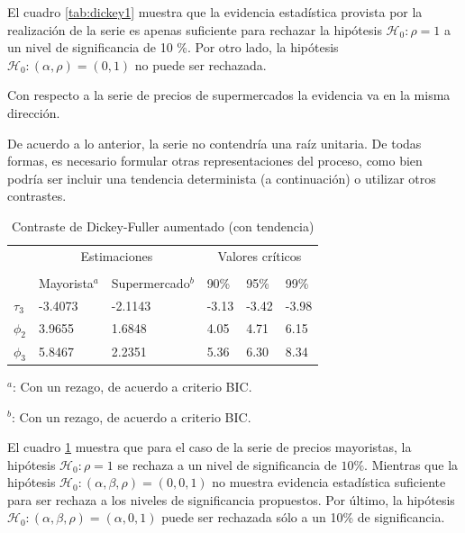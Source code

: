 \documentclass[12pt, twoside]{book}\usepackage[]{graphicx}\usepackage[]{color}
\numberwithin{equation}{section}
\numberwithin{theorem}{section}
\numberwithin{teorema}{section}
\numberwithin{defi}{section}
\numberwithin{prop}{section}
\numberwithin{defi}{section}
\theoremstyle{plain}
\begin{document}
El cuadro \ref{tab:dickey1} muestra que la evidencia estadística provista por la realización de la serie es apenas suficiente para rechazar la hipótesis $\mathcal{H}_{0}: \rho = 1$ a un nivel de significancia de 10 \%. Por otro lado, la hipótesis $\mathcal{H}_{0}: (\alpha,\rho) = (0,1) $ no puede ser rechazada.

Con respecto a la serie de precios de supermercados la evidencia va en la misma dirección. 

De acuerdo a lo anterior, la serie no contendría una raíz unitaria. De todas formas, es necesario formular otras representaciones del proceso, como bien podría ser incluir una tendencia determinista (a continuación) o utilizar otros contrastes. 

\begin{table}[!htpb]
\centering
\begin{threeparttable}
\caption{Contraste de Dickey-Fuller aumentado (con tendencia)\label{tab:dickey2}}
\begin{tabular}{@{}llllll@{}}
\toprule
\multicolumn{1}{l}{} & \multicolumn{2}{c}{Estimaciones} &
\multicolumn{3}{c}{Valores críticos} \\
\cmidrule(l){2-3} \cmidrule(l){4-6} \\
\multicolumn{1}{l}{} & \multicolumn{1}{c}{Mayorista$^{a}$} &
 \multicolumn{1}{c}{Supermercado$^{b}$} &
\multicolumn{1}{l}{90\%}&
\multicolumn{1}{l}{95\%}&
\multicolumn{1}{l}{99\%}
\\
\midrule
$\tau_{3} $  & -3.4073 &  -2.1143  &  -3.13 & -3.42  &  -3.98 \\
$\phi_{2} $  & 3.9655  &  1.6848   &  4.05 &  4.71 &  6.15 \\
$\phi_{3} $  & 5.8467  &  2.2351   &  5.36 &  6.30 &  8.34 \\
\bottomrule
\end{tabular}
\begin{tablenotes}
\small 
\item $^{a}$: Con un rezago, de acuerdo a criterio BIC. 
\item $^{b}$: Con un rezago, de acuerdo a criterio BIC. 
\end{tablenotes}
\end{threeparttable}
\end{table}


El cuadro \ref{tab:dickey2} muestra que para el caso de la serie de precios mayoristas, la hipótesis $\mathcal{H}_{0}: \rho=1$ se rechaza a un nivel de significancia de $10\%$. Mientras que la hipótesis $\mathcal{H}_{0}: (\alpha, \beta, \rho)=(0,0,1)$  no muestra evidencia estadística suficiente para ser rechaza a los niveles de significancia propuestos. Por último, la hipótesis $\mathcal{H}_{0}: (\alpha, \beta,\rho)=(\alpha,0,1)$ puede ser rechazada sólo a un 10\% de significancia. 
\end{document}
